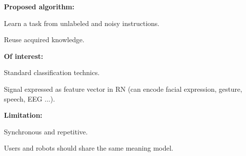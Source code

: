 \documentclass[a0,final, portrait]{inriaposter}
\begin{document}
\begin{multicols}{2}
{
\textbf{Proposed algorithm:}
\begin{inparaenum}
\item Learn a task from unlabeled and noisy instructions.
\item Reuse acquired knowledge.
\end{inparaenum}

\textbf{Of interest:}
\begin{inparaenum}
\item Standard classification technics.
\item Signal expressed as feature vector in RN (can encode facial
expression, gesture, speech, EEG ...).
\end{inparaenum}

\textbf{Limitation:}
\begin{inparaenum}
\item Synchronous and repetitive.
\item Users and robots should share the same meaning model.
\end{inparaenum}
}


{
	\vspace{-10pt}
	
	\renewcommand{\section}[2]{}%
	
	\vspace{-10pt}
}

\end{multicols}
\vfill
\end{document}
